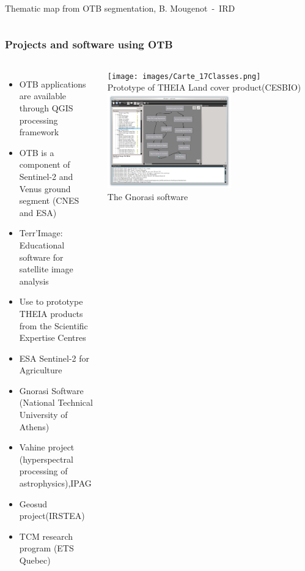 \documentclass[8pt]{beamer}
\begin{document}
\begin{frame}
\begin{columns}
\tiny{Thematic map from OTB segmentation, B. Mougenot~-~IRD}
\end{columns}
\end{frame}

\begin{frame}
\frametitle{Projects and software using OTB}
\begin{columns}
  \begin{itemize}
    \item OTB applications are available through QGIS processing framework
    \item OTB is a component of \alert{Sentinel-2} and Venus ground segment (CNES and ESA)
    \item Terr'Image: Educational software for satellite image analysis
    \item Use to prototype \alert{THEIA} products from the Scientific Expertise Centres
    \item ESA Sentinel-2 for Agriculture 
    \item Gnorasi Software (National Technical University of Athens)
    \item Vahine project (hyperspectral processing of astrophysics),IPAG
    \item Geosud project(IRSTEA)
    \item TCM research program (ETS Quebec)
  \end{itemize}
  \begin{center}
  \texttt{[image: images/Carte\_17Classes.png]}\\
  \tiny{Prototype of THEIA Land cover product(CESBIO)}
  \includegraphics[width=0.6\textwidth,height=0.35\textheight]{images/gnorasi2.png}\\
  \tiny{The Gnorasi software}
  \end{center}
\end{columns}
\end{frame}
\end{document}
